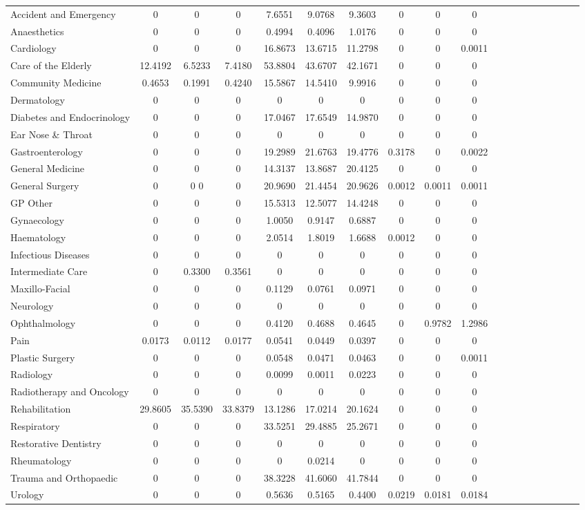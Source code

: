 \documentclass[thesis.tex]{subfiles}
\begin{document}
\begin{landscape}
\begin{table}[h!]
{\begin{tabular}{lcccccccccccccccccc}
Accident and Emergency	&0&	0&	0&	7.6551&	9.0768&	9.3603	&0&	0&	0\\
Anaesthetics&	0&	0&	0&	0.4994	&0.4096&	1.0176	&0&	0&	0\\
Cardiology&	0&	0&0&	16.8673&	13.6715&	11.2798&	0&	0&	0.0011\\
Care of the Elderly&	12.4192&	6.5233	&7.4180	&53.8804	&43.6707&	42.1671&	0&	0&	0\\
Community Medicine&	0.4653	&0.1991	&0.4240&15.5867	&14.5410&	9.9916&	0&	0&	0\\
Dermatology&	0&	0&	0&	0&	0&	0&	0&	0&	0\\
Diabetes and Endocrinology&	0&	0&	0&	17.0467&	17.6549&	14.9870&	0&	0&	0\\
Ear Nose \& Throat&	0&	0&	0&	0&	0&	0&	0&	0&	0\\
Gastroenterology&	0&	0&	0&	19.2989&	21.6763	&19.4776&	0.3178	&0&	0.0022\\
General Medicine&	0&	0&	0&	14.3137&	13.8687	&20.4125	&0&	0&	0\\
General Surgery&	0&0	0&	0&20.9690	&21.4454	&20.9626&	0.0012	&0.0011	&0.0011\\
GP Other	&0&0&	0&	15.5313&	12.5077&	14.4248	&0&	0&	0\\
Gynaecology	&0&	0&	0&	1.0050&	0.9147&	0.6887	&0&	0&	0\\
Haematology&	0&	0&	0&	2.0514&	1.8019&	1.6688&	0.0012&	0&	0\\
Infectious Diseases	&0&	0&	0&	0&	0&	0&	0&	0&	0\\
Intermediate Care&	0&	0.3300&	0.3561&	0&	0&	0&	0&	0&	0\\
Maxillo-Facial&	0&	0&	0&	0.1129	&0.0761&	0.0971&	0&	0&	0\\
Neurology	&0&	0&	0&	0&	0&	0&0&	0&	0\\
Ophthalmology&	0&	0&	0&	0.4120&	0.4688&	0.4645&	0&	0.9782&	1.2986\\
Pain&	0.0173&	0.0112	&0.0177&	0.0541	&0.0449	&0.0397&	0&	0&0\\
Plastic Surgery	&0&	0&	0&	0.0548	&0.0471&	0.0463&	0&	0&	0.0011\\
Radiology&	0&	0&	0&	0.0099	&0.0011&	0.0223&	0&	0&	0\\
Radiotherapy and Oncology&	0&	0&	0&	0&	0&	0&	0&	0&	0\\
Rehabilitation	&29.8605	&35.5390	&33.8379&	13.1286&	17.0214&	20.1624&	0&	0&	0\\
Respiratory&	0&	0&	0&	33.5251&	29.4885&	25.2671&	0&	0&0	\\
Restorative Dentistry	&0&	0&	0&	0&	0&	0&	0&	0&	0\\
Rheumatology&	0&	0&	0&	0&	0.0214&	0&	0&	0&	0\\
Trauma and Orthopaedic&	0&	0&	0&	38.3228&	41.6060&	41.7844&	0&	0&	0\\
Urology&	0&	0&	0&	0.5636	&0.5165&	0.4400	&0.0219	&0.0181	&0.0184\\
\bottomrule



\end{tabular}}
\end{table}
\end{landscape}
\end{document}
